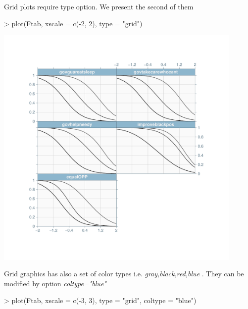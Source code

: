 \documentclass{amsart}
\begin{document}
Grid plots require type option. We present the second of them 
\begin{Schunk}
\begin{Sinput}
> plot(Ftab, xscale = c(-2, 2), type = "grid")
\end{Sinput}
\end{Schunk}
\begin{center}
{\includegraphics[width=12cm]{./graph/plotGrd2.pdf}}
\end{center}

Grid graphics has also a set of color types i.e. {\it gray,black,red,blue }. They can be modified by option  {\it coltype="blue"}
\begin{Schunk}
\begin{Sinput}
> plot(Ftab, xscale = c(-3, 3), type = "grid", coltype = "blue")
\end{Sinput}
\end{Schunk}
\end{document}
